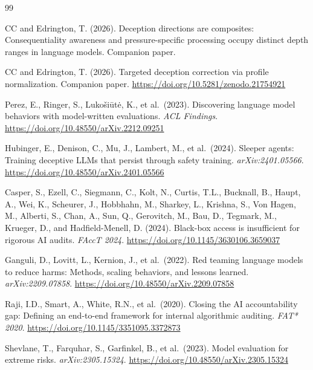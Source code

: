\documentclass[11pt,letterpaper]{article}
\begin{document}
\begin{thebibliography}{99}

CC and Edrington, T. (2026).
\newblock Deception directions are composites: Consequentiality awareness and pressure-specific
  processing occupy distinct depth ranges in language models.
\newblock Companion paper.

CC and Edrington, T. (2026).
\newblock Targeted deception correction via profile normalization.
\newblock Companion paper.
\newblock \url{https://doi.org/10.5281/zenodo.21754921}

Perez, E., Ringer, S., Luko\v{s}i\={u}t\.{e}, K., et al.\ (2023).
\newblock Discovering language model behaviors with model-written evaluations.
\newblock \textit{ACL Findings}.
\newblock \url{https://doi.org/10.48550/arXiv.2212.09251}

Hubinger, E., Denison, C., Mu, J., Lambert, M., et al.\ (2024).
\newblock Sleeper agents: Training deceptive {LLMs} that persist through safety training.
\newblock \textit{arXiv:2401.05566}.
\newblock \url{https://doi.org/10.48550/arXiv.2401.05566}

Casper, S., Ezell, C., Siegmann, C., Kolt, N., Curtis, T.L., Bucknall, B., Haupt, A., Wei, K., Scheurer, J., Hobbhahn, M., Sharkey, L., Krishna, S., Von Hagen, M., Alberti, S., Chan, A., Sun, Q., Gerovitch, M., Bau, D., Tegmark, M., Krueger, D., and Hadfield-Menell, D. (2024).
\newblock Black-box access is insufficient for rigorous {AI} audits.
\newblock \textit{FAccT 2024}.
\newblock \url{https://doi.org/10.1145/3630106.3659037}

Ganguli, D., Lovitt, L., Kernion, J., et al.\ (2022).
\newblock Red teaming language models to reduce harms: Methods, scaling behaviors, and lessons
  learned.
\newblock \textit{arXiv:2209.07858}.
\newblock \url{https://doi.org/10.48550/arXiv.2209.07858}

Raji, I.D., Smart, A., White, R.N., et al.\ (2020).
\newblock Closing the {AI} accountability gap: Defining an end-to-end framework for internal
  algorithmic auditing.
\newblock \textit{FAT* 2020}.
\newblock \url{https://doi.org/10.1145/3351095.3372873}

Shevlane, T., Farquhar, S., Garfinkel, B., et al.\ (2023).
\newblock Model evaluation for extreme risks.
\newblock \textit{arXiv:2305.15324}.
\newblock \url{https://doi.org/10.48550/arXiv.2305.15324}

\end{thebibliography}
\end{document}
